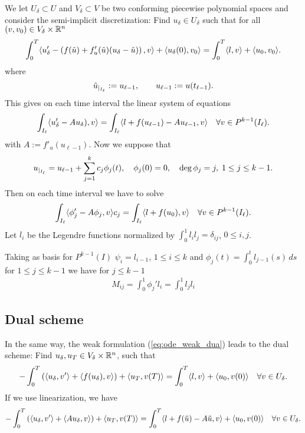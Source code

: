 \documentclass[english,12pt,a4paper]{article}
\begin{document}
We let $U_{\delta}\subset U$ and $V_{\delta}\subset V$ be two conforming piecewise polynomial spaces and consider the semi-implicit discretization: Find $u_{\delta}\in U_{\delta}$ such that 
for all $(v,v_0)\in V_{\delta}\times\mathbb R^n$
%
\begin{equation}\label{eq:ode_weak_delta}
\int_0^T \langle u_{\delta}' - \left( f(\tilde u) + f'_u(\tilde u)(u_{\delta}-\tilde u)\right),v\rangle + \langle u_{\delta}(0),v_0\rangle = \int_0^T \langle l,v\rangle + \langle u_0,v_0\rangle.
\end{equation}
%
where
%
\begin{equation}\label{eq:}
{\tilde u}_{|_{I_{\ell}}} := u_{\ell-1},\qquad u_{\ell-1} := u(t_{\ell-1}).
\end{equation}
%
This gives on each time interval the linear system of equations
%
\begin{align*}
\int_{I_{\ell}} \langle u_{\delta}' - A u_{\delta}),v\rangle  = \int_{I_{\ell}} \langle l+f(u_{\ell-1})-A u_{\ell-1},v\rangle \quad \forall v\in P^{k-1}(I_{\ell}).
\end{align*}
%
with $A:=f'_u(u_{\ell-1})$.  Now we suppose that 
%
\begin{equation}\label{eq:ode_weak_u_in_basis}
{u}_{|_{I_{\ell}}} = u_{\ell-1} + \sum_{j=1}^k c_j \phi_j(t),\quad \phi_j(0)= 0,\quad \deg\phi_j = j,\; 1\le j\le k-1. 
\end{equation}
%
Then on each time interval we have to solve
%
\begin{align*}
\int_{I_{\ell}} \langle\phi_j' -  A\phi_j,v\rangle c_j  = \int_{I_{\ell}} \langle l+ f(u_0),v\rangle \quad \forall v\in P^{k-1}(I_{\ell}).
\end{align*}
%
Let $l_i$  be the Legendre functions normalized by $\int_0^1 l_il_j=\delta_{ij}$, $0\le i,j$. 

Taking as basis for $P^{k-1}(I)$  $\psi_i = l_{i-1}$, $1\le i\le k$ and 
$\phi_j(t) = \int_0^t l_{j-1}(s)\,ds$ for $1\le j\le k-1$ we have for $j\le k-1$
%
\begin{align*}
M_{ij} = \int_0^1 \phi_j'l_i = \int_0^1 l_j l_i
\end{align*}
%
%
\subsection{Dual scheme}\label{subsec:}
%
In the same way, the weak formulation (\ref{eq:ode_weak_dua}) leads to the dual scheme: Find $u_{\delta},u_T\in V_{\delta}\times\mathbb R^n$, such that
%
\begin{equation}\label{eq:ode_weak_dual_delta}
-\int_0^T \left(\langle u_{\delta},v'\rangle+ \langle f(u_{\delta}),v\rangle\right)+ \langle u_T,v(T)\rangle = \int_0^T \langle l,v\rangle + \langle u_0,v(0)\rangle \quad\forall v\in U_{\delta}.
\end{equation}
%
If we use linearization, we have
%
\begin{equation}\label{eq:ode_weak_dual_delta_lin}
-\int_0^T \left(\langle u_{\delta},v'\rangle+ \langle A u_{\delta},v\rangle\right)+ \langle u_T,v(T)\rangle = \int_0^T \langle l+f(\tilde u) - A \tilde u,v\rangle + \langle u_0,v(0)\rangle \quad\forall v\in U_{\delta}.
\end{equation}
%
\end{document}
